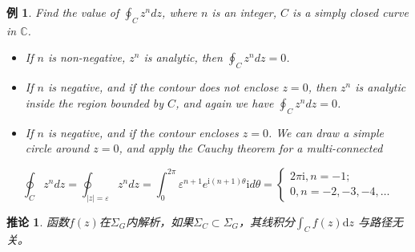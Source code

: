 \documentclass[10pt, a4paper, oneside]{ctexbook}
\newtheorem{corollary}[theorem]{推论}
\newtheorem{example}[theorem]{例}
\def\D{\mathrm{d}}
\begin{document}
\begin{example}
Find the value of $\displaystyle \oint_{C} z^{n} d z$, where $n$ is an integer, $C$ is a simply closed curve in $\mathbb{C}$.
\begin{itemize} \rm
\item  If $n$ is non-negative, $z^{n}$ is analytic, then $\displaystyle \oint_{C} z^{n} d z=0$.
\item  If $n$ is negative, and if the contour does not enclose $z=0$, then $z^{n}$ is analytic inside the region bounded by $C$, and again we have $\displaystyle \oint_{C} z^{n} d z=0$.
\item  If $n$ is negative, and if the contour encloses $z=0$. We can draw a simple circle around $z=0$, and apply the Cauchy theorem for a multi-connected 
\end{itemize}
\begin{equation*}
\oint_{C} z^{n} d z=\oint_{|z|=\varepsilon} z^{n} d z=\int_{0}^{2 \pi} \varepsilon^{n+1} e^{\mathrm{i}(n+1) \theta} \mathrm{i} d \theta=\left\{\begin{array}{l}
2 \pi \mathrm{i}, n=-1 ; \\
0, n=-2,-3,-4, \ldots
\end{array}\right.
\end{equation*}
\end{example}
\begin{corollary}
    函数$f(z)$在$\Sigma_G$内解析，如果$\Sigma_C\subset \Sigma_G$，其线积分$\displaystyle \int_C f(z)\D z$ 与路径无关。
\end{corollary}
\end{document}
